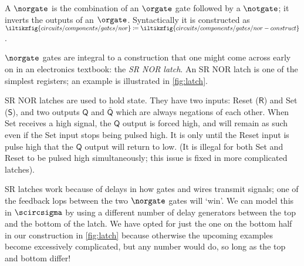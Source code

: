\begin{example}[SR latch]\label{ex:sr-latch}
    A \(\norgate\) is the combination of an \(\orgate\) gate followed by a
    \(\notgate\); it inverts the outputs of an \(\orgate\).
    Syntactically it is constructed as \(
        \iltikzfig{circuits/components/gates/nor}
        \coloneqq
        \iltikzfig{circuits/components/gates/nor-construct}
    \).

    \(\norgate\) gates are integral to a construction that one might come across
    early on in an electronics textbook: the \emph{SR NOR latch}.
    An SR NOR latch is one of the simplest registers; an example is illustrated
    in \cref{fig:latch}.

    SR NOR latches are used to hold state.
    They have two inputs: Reset (\(\mathsf{R}\)) and Set (\(\mathsf{S}\)), and
    two outputs \(\mathsf{Q}\) and \(\bar{\mathsf{Q}}\) which are always
    negations of each other.
    When Set receives a high signal, the \(\mathsf{Q}\) output is forced high,
    and will remain as such even if the Set input stops being pulsed high.
    It is only until the Reset input is pulse high that the \(\mathsf{Q}\)
    output will return to low.
    (It is illegal for both Set and Reset to be pulsed high simultaneously; this
    issue is fixed in more complicated latches).

    SR latches work because of delays in how gates and wires transmit signals;
    one of the feedback lops between the two \(\norgate\) gates will `win'.
    We can model this in \(\scircsigma\) by using a different number of delay
    generators between the top and the bottom of the latch.
    We have opted for just the one on the bottom half in our construction in
    \cref{fig:latch}
    because otherwise the upcoming examples become excessively complicated, but
    any number would do, so long as the top and bottom differ!
\end{example}

